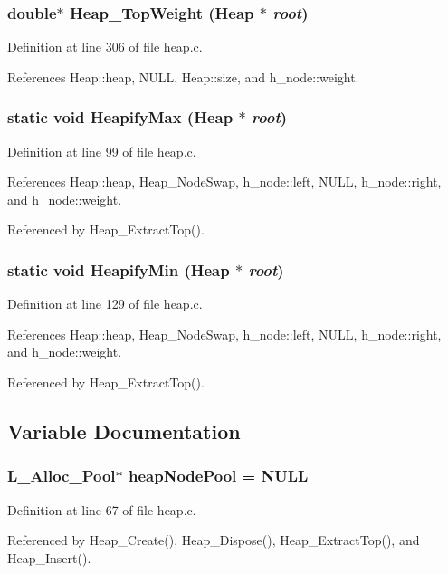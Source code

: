 \subsubsection{\setlength{\rightskip}{0pt plus 5cm}double$\ast$ Heap\_\-Top\-Weight (\bf{Heap} $\ast$ {\em root})}\label{heap_8c_bc2333b91d4483d3298757beb0814004}




Definition at line 306 of file heap.c.

References Heap::heap, NULL, Heap::size, and h\_\-node::weight.
\subsubsection{\setlength{\rightskip}{0pt plus 5cm}static void Heapify\-Max (\bf{Heap} $\ast$ {\em root})\hspace{0.3cm}{\tt  [static]}}\label{heap_8c_20467067290398d14ade670ecd105ada}




Definition at line 99 of file heap.c.

References Heap::heap, Heap\_\-Node\-Swap, h\_\-node::left, NULL, h\_\-node::right, and h\_\-node::weight.

Referenced by Heap\_\-Extract\-Top().
\subsubsection{\setlength{\rightskip}{0pt plus 5cm}static void Heapify\-Min (\bf{Heap} $\ast$ {\em root})\hspace{0.3cm}{\tt  [static]}}\label{heap_8c_10fe7126679559cf46f31aa1b992547b}




Definition at line 129 of file heap.c.

References Heap::heap, Heap\_\-Node\-Swap, h\_\-node::left, NULL, h\_\-node::right, and h\_\-node::weight.

Referenced by Heap\_\-Extract\-Top().

\subsection{Variable Documentation}
\subsubsection{\setlength{\rightskip}{0pt plus 5cm}\bf{L\_\-Alloc\_\-Pool}$\ast$ \bf{heap\-Node\-Pool} = NULL\hspace{0.3cm}{\tt  [static]}}\label{heap_8c_c8616043742d3cf292051e4a8d12c800}




Definition at line 67 of file heap.c.

Referenced by Heap\_\-Create(), Heap\_\-Dispose(), Heap\_\-Extract\-Top(), and Heap\_\-Insert().